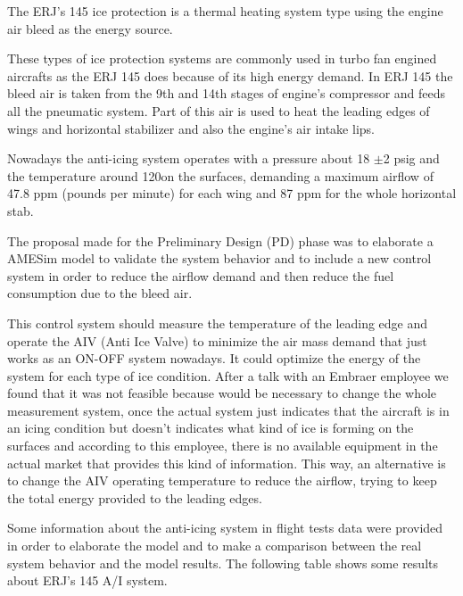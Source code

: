 ﻿The ERJ's 145 ice protection is a thermal heating system type using the engine air bleed as the energy source.

These types of ice protection systems are commonly used in turbo fan engined aircrafts as the ERJ 145 does because of its high energy demand.
In ERJ 145 the bleed air is taken from the 9th and 14th stages of engine's compressor and feeds all the pneumatic system. Part of this air is used to heat the leading edges of wings and horizontal stabilizer and also the engine's air intake lips.

Nowadays the anti-icing system operates with a pressure about 18 $\pm$2 psig and the temperature around 120\celsius on the surfaces, demanding a maximum airflow of 47.8 ppm (pounds per minute) for each wing and 87 ppm for the whole horizontal stab.

The proposal made for the Preliminary Design (PD) phase was to elaborate a AMESim model to validate the system behavior and to include a new control system in order to reduce the airflow demand and then reduce the fuel consumption due to the bleed air.

This control system should measure the temperature of the leading edge and operate the AIV (Anti Ice Valve) to minimize the air mass demand that just works as an ON-OFF system nowadays. It could optimize the energy of the system for each type of ice condition. After a talk with an Embraer employee we found that it was not feasible because would be necessary to change the whole measurement system, once the actual system just indicates that the aircraft is in an icing condition but doesn't indicates what kind of ice is forming on the surfaces and according to this employee, there is no available equipment in the actual market that provides this kind of information. This way, an alternative is to change the AIV operating temperature to reduce the airflow, trying to keep the total energy provided to the leading edges.

Some information about the anti-icing system in flight tests data were provided in order to elaborate the model and to make a comparison between the real system behavior and the model results.
The following table shows some results about ERJ's 145 A/I system.
